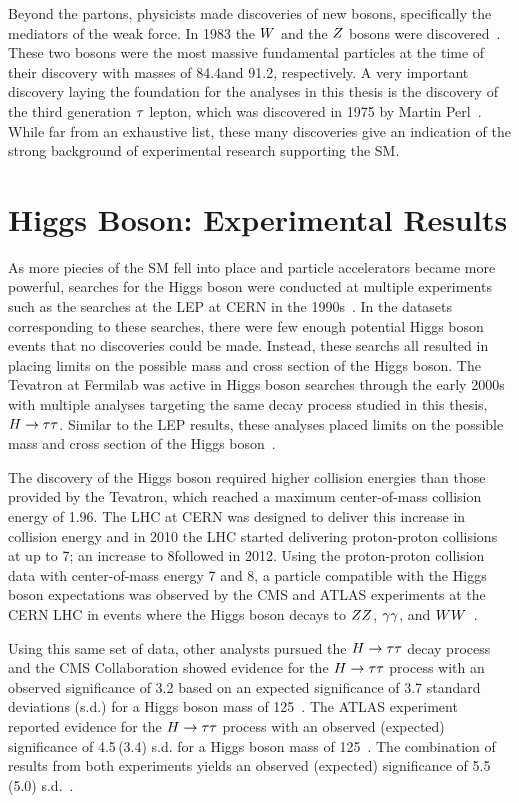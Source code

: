 Beyond the partons, physicists made discoveries of new bosons, specifically the mediators
of the weak force.
In 1983 the $W$ and the $Z$ bosons were discovered~\cite{AUBERT1983275,1983398}. 
These two bosons were the
most massive fundamental particles at the time of their discovery with masses of
84.4\GeV and 91.2\GeV, respectively.
A very important discovery laying the foundation for the analyses in this thesis is
the discovery of the third generation $\tau$ lepton, which was discovered
in 1975 by Martin Perl~\cite{PhysRevLett.35.1489}. While far from an exhaustive list,
these many discoveries give an indication of the strong background of experimental
research supporting the SM.

\section{Higgs Boson: Experimental Results}
As more piecies of the SM fell into place and particle accelerators became more powerful,
searches for the Higgs boson were conducted at multiple experiments such as the searches
at the LEP at CERN in the 1990s~\cite{Barate:2000ts,Abdallah:2003ip,Achard:2001pj,Abbiendi:2000ac}.
In the datasets corresponding to these searches, there were few enough potential Higgs
boson events that no discoveries could be made.
Instead, these searchs all resulted in placing limits on the possible mass and cross section
of the Higgs boson. The Tevatron at Fermilab was active in Higgs boson searches through the early 2000s
with multiple analyses targeting the same decay process studied in this thesis, $H\to\tau\tau$. 
Similar to the LEP results, these analyses
placed limits on the possible mass and cross section of the Higgs boson~\cite{Aaltonen:2012jh, Abazov:2012zj}.

The discovery of the Higgs boson required higher collision energies than those provided
by the Tevatron, which reached a maximum center-of-mass collision energy of 1.96\TeV. The
LHC at CERN was designed to deliver this increase in collision energy and in 2010 the LHC started
delivering proton-proton collisions at up to 7\TeV; an increase to 8\TeV followed in 2012.
Using the proton-proton collision data with center-of-mass energy 7 and 8\TeV,
a particle compatible with the Higgs boson expectations was observed by the CMS and ATLAS experiments at the CERN LHC
in events where the Higgs boson decays to $ZZ$, $\gamma\gamma$, and 
$WW$~\cite{Aad:2012tfa, Chatrchyan:2012xdj, Chatrchyan:2013lba}.

Using this same set of data, other analysts pursued the $H\to\tau\tau$ decay process and
the CMS Collaboration showed evidence for the $H\to\tau\tau$ process with an observed
significance of 3.2 based on an expected significance of 3.7 standard deviations (s.d.)
for a Higgs boson mass of 125\GeV~\cite{Chatrchyan:2014nva}.
The ATLAS experiment reported evidence for the $H\to\tau\tau$ process 
with an observed (expected) significance of 4.5\,(3.4)
s.d. for a Higgs boson mass of 125\GeV~\cite{Aad:2015vsa}.
The combination of results from both experiments yields an observed (expected)
significance of 5.5\,(5.0) s.d.~\cite{Khachatryan:2016vau}.

